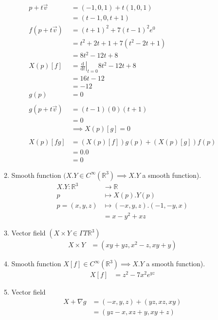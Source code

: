 \documentclass{article}
\renewcommand{\d}{\mathrm{d}}
\newcommand{\R}{\mathbb{R}}
\newcommand{\dv}[2]{\frac{\d #1}{\d #2}}
\newcommand{\fdv}[3]{\left.\dv{#1}{#2}\right|_{#3}}
\theoremstyle{definition}
\theoremstyle{remark}
\theoremstyle{example}
\begin{document}
\begin{enumerate}
\begin{enumerate}
\begin{align*}
				p+t\vec{v}&=(-1,0,1)+t(1,0,1)\\
				&=(t-1,0,t+1)\\
				f(p+t\vec{v})&=(t+1)^2+7(t-1)^2e^0\\
				&=t^2+2t+1+7(t^2-2t+1)\\
				&=8t^2-12t+8\\
				X(p)[f]&=\fdv{}{t}{t=0}8t^2-12t+8\\
				&=16t-12\\
				&=-12\\
				g(p)&=0\\
				\\
				g(p+t\vec{v})&=(t-1)(0)(t+1)\\
				&=0\\
				&\implies X(p)[g]=0\\
				\\
				X(p)[fg]&=(X(p)[f])g(p)+(X(p)[g])f(p)\\
				&=0.0\\
				&=0				
			\end{align*}
			\item Smooth function $(X.Y \in C^\infty (\R^3) \implies X.Y$ a smooth function).
			\begin{align*}
				X.Y:\R^3 & \to \R\\
				p & \mapsto X(p).Y(p)\\
				p=(x,y,z) &\mapsto (-x,y,z).(-1,-y,x)\\
				& = x -y^2 + xz
			\end{align*}
			\item Vector field $(X \times Y \in \Gamma T \R^3)$
			\begin{align*}
				X \times Y & = (xy+yz, x^2 -z,xy+y)
			\end{align*}
			\item Smooth function $X[f] \in C^\infty (\R^3) \implies X.Y$ a smooth function).
			\begin{align*}
				X[f] & = z^2 - 7x^2e^{yz}
			\end{align*}
			\item Vector field
			\begin{align*}
				X+\nabla g & = (-x,y,z) + (yz,xz,xy)\\
				& = (yz-x,xz+y,xy+z)
			\end{align*}
		\end{enumerate}
	\end{enumerate}
	
\end{document}
